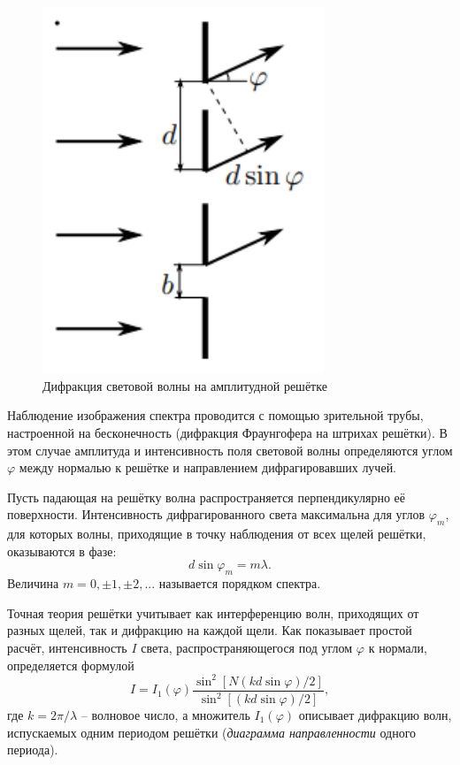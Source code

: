 \documentclass[a4paper,12pt]{article}
\begin{document}
\begin{figure}\label{fig: Amplitude grating}
    \begin{center}
    \vspace{-20pt}
        \includegraphics[width = 0.75\textwidth]{Amplitude grating.png}
    \end{center}
    \caption{ Дифракция световой волны на амплитудной решётке}
\end{figure}

Наблюдение изображения спектра проводится с помощью зрительной трубы, настроенной на бесконечность (дифракция Фраунгофера на штрихах решётки). В этом случае амплитуда и интенсивность поля световой волны определяются углом $\varphi$ между нормалью к решётке и направлением дифрагировавших лучей. 

Пусть падающая на решётку волна распространяется перпендикулярно её поверхности. Интенсивность дифрагированного света максимальна для углов $\varphi_m$, для которых волны, приходящие в точку наблюдения от всех щелей решётки, оказываются в фазе:
\begin{equation}\label{eq: max condition}
    d \sin{\varphi_m} = m \lambda.
\end{equation}
Величина $m = 0, \pm 1, \pm 2, ...$ называется порядком спектра.

Точная теория решётки учитывает как интерференцию волн, приходящих от разных щелей, так и дифракцию на каждой щели. Как показывает простой расчёт, интенсивность $I$ света, распространяющегося под углом $\varphi$ к нормали, определяется формулой
\begin{equation}\label{eq: intensity via phi}
    I = I_1(\varphi) \frac{\sin^2[N(kd \sin\varphi) / 2]}{\sin^2[(kd \sin\varphi) / 2]},
\end{equation}
где $k = 2\pi / \lambda$ -- волновое число, а множитель $I_1(\varphi)$ описывает дифракцию волн, испускаемых одним периодом решётки (\textit{диаграмма направленности} одного периода).
\end{document}
